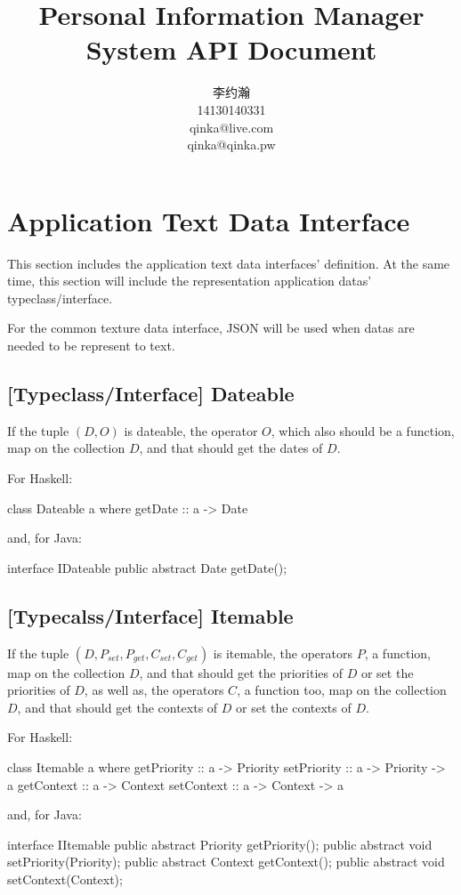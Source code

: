 \documentclass{article}
\title{Personal Information Manager System API Document}
\author{李约瀚 \\ 14130140331 \\ qinka@live.com \\ qinka@qinka.pw}
\begin{document}
    \maketitle
    \newpage
    \tableofcontents
    \newpage
    
    \section{Application Text Data Interface}
    This section includes the application text data interfaces' definition.
    At the same time, this section will include the representation application datas' typeclass/interface.
    
    For the common texture data interface, JSON will be used when datas are needed to be represent to text.
    
    \subsection{[Typeclass/Interface] Dateable}
    If the tuple $(D,O)$ is dateable, the operator $O$, which also should be a function, 
    map on the collection $D$, and that should get the dates of $D$.
    
    For Haskell:
    \begin{haskell}
 class Dateable a where
   getDate :: a -> Date
    \end{haskell}
    and, for Java:
    \begin{java}
  interface IDateable
  {
      public abstract Date getDate();
  }
    \end{java}
    
    \subsection{[Typecalss/Interface] Itemable}
    If the tuple $(D,P_{set},P_{get},C_{set},C_{get})$ is itemable, the operators $P$, a function, map on the collection $D$,
    and that should get the priorities of $D$ or set the priorities of $D$, as well as, the operators $C$,
    a function too, map on the collection $D$, and that should get the contexts of $D$ or set the contexts of $D$.
    
    For Haskell:
    \begin{haskell}
 class Itemable a where
   getPriority :: a -> Priority
   setPriority :: a -> Priority -> a
   getContext  :: a -> Context
   setContext  :: a -> Context  -> a
    \end{haskell}
    and, for Java:
    \begin{java}
  interface IItemable
  {
      public abstract Priority getPriority();
      public abstract void     setPriority(Priority);
      public abstract Context  getContext();
      public abstract void     setContext(Context);
  }
    \end{java}
    
\end{document}
